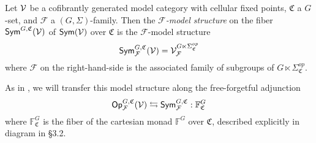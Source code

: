 \documentclass[a4paper,10pt
,draft
]{article}%
\renewcommand{\F}{\mathcal F}
\renewcommand{\1}{\eta}%
\newcommand{\UC}{\underline{\mathfrak C}}
\begin{document}
\begin{definition}
      Let $\mathcal V$ be a cofibrantly generated model category with cellular fixed points,
      $\mathfrak C$ a $G$-set, and $\F$ a $(G, \Sigma)$-family.
      Then the \textit{$\F$-model structure} on the fiber $\mathsf{Sym}^{G,\mathfrak C}(\mathcal V)$ of $\mathsf{Sym}(\mathcal V)$ over $\mathfrak C$
      is the $\F$-model structure
      \begin{equation}
            \Sym^{G,\mathfrak C}_\F(\V) = \V^{G \ltimes \Sigma_{\mathfrak C}^{op}}_{\F}
      \end{equation}
      where $\F$ on the right-hand-side is the associated family of subgroups of $G \ltimes \Sigma_{\mathfrak C}^{op}$.
\end{definition}



As in \cite{BP_geo}, we will transfer this model structure along the free-forgetful adjunction
\[
      \Op^{G, \mathfrak C}_\F(\V) \leftrightarrows \Sym^{G, \mathfrak C}_\F: \mathbb F^G_{\mathfrak C}
\]
where $\mathbb F^G_{\mathfrak C}$ is the fiber of the cartesian monad $\mathbb F^G$ over $\mathfrak C$,
described explicitly in {\color{red} diagram in \S 3.2}.
\end{document}
